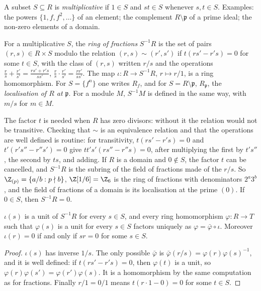 A subset $S\subseteq R$ is \emph{multiplicative} if $1\in S$ and $st\in S$ whenever $s,t\in S$. Examples: the powers $\{1,f,f^2,\dots\}$ of an element; the complement $R\setminus\mathfrak p$ of a prime ideal; the
non-zero elements of a domain.

\begin{definition}\label{def:localisation}
For a multiplicative $S$, the \emph{ring of fractions} $S^{-1}R$ is the set of pairs $(r,s)\in R\times S$ modulo the relation $(r,s)\sim(r',s')$ if $t(rs'-r's)=0$ for some $t\in S$, with the class of $(r,s)$ written $r/s$ and
the operations $\frac rs+\frac{r'}{s'}=\frac{rs'+r's}{ss'}$, $\frac rs\cdot\frac{r'}{s'}=\frac{rr'}{ss'}$. The map $\iota\colon R\to S^{-1}R$, $r\mapsto r/1$, is a ring homomorphism. For $S=\{f^n\}$ one writes $R_f$, and for $S=R\setminus\mathfrak p$, $R_{\mathfrak p}$,
the \emph{localisation of $R$ at $\mathfrak p$}. For a module $M$, $S^{-1}M$ is defined in the same way, with $m/s$ for $m\in M$.
\end{definition}

The factor $t$ is needed when $R$ has zero divisors: without it the relation would not be transitive. Checking that $\sim$ is an equivalence relation and that the operations are well defined is routine: for
transitivity, $t(rs'-r's)=0$ and $t'(r's''-r''s')=0$ give $tt's'(rs''-r''s)=0$, after multiplying the first by $t's''$, the second by $ts$, and adding. If $R$ is a domain and $0\notin S$, the factor
$t$ can be cancelled, and $S^{-1}R$ is the subring of the field of fractions made of the $r/s$. So $\Z_{(p)}=\{a/b:p\nmid b\}$, $\Z[1/6]=\Z_6$ is the ring of fractions with denominators $2^a3^b$, and the
field of fractions of a domain is its localisation at the prime $(0)$. If $0\in S$, then $S^{-1}R=0$.

\begin{proposition}\label{prop:locuniv}
$\iota(s)$ is a unit of $S^{-1}R$ for every $s\in S$, and every ring homomorphism $\varphi\colon R\to T$ such that $\varphi(s)$ is a unit for every $s\in S$ factors uniquely as $\varphi=\bar\varphi\circ\iota$. Moreover
$\iota(r)=0$ if and only if $sr=0$ for some $s\in S$.
\end{proposition}

\begin{proof}
$\iota(s)$ has inverse $1/s$. The only possible $\bar\varphi$ is $\bar\varphi(r/s)=\varphi(r)\varphi(s)^{-1}$, and it is well defined: if $t(rs'-r's)=0$, then $\varphi(t)$ is a unit, so $\varphi(r)\varphi(s')=\varphi(r')\varphi(s)$. It is a homomorphism by the
same computation as for fractions. Finally $r/1=0/1$ means $t(r\cdot1-0)=0$ for some $t\in S$.
\end{proof}

